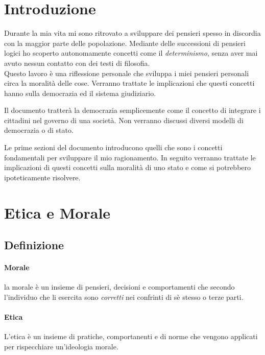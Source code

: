 \documentclass{article}
\begin{document}
\pagebreak

\tableofcontents
\pagebreak

\section{Introduzione}

Durante la mia vita mi sono ritrovato a sviluppare dei pensieri
spesso in discordia con la maggior parte delle popolazione.
Mediante delle successioni di pensieri logici ho scoperto autonomamente concetti
come il \textit{determinismo}, senza aver mai avuto nessun contatto con dei testi di filosofia.
\\
Questo lavoro è una riflessione personale che sviluppa i miei pensieri
personali circa la moralità delle cose. Verranno trattate le implicazioni
che questi concetti hanno sulla democrazia ed il sistema giudiziario.

Il documento tratterà la democrazia semplicemente come il concetto di integrare i cittadini
nel governo di una società. Non verranno discussi diversi modelli di democrazia o di stato.

Le prime sezioni del documento introducono quelli che sono i concetti fondamentali per
sviluppare il mio ragionamento. In seguito verranno trattate
le implicazioni di questi concetti sulla moralità di uno stato e come si potrebbero
ipoteticamente risolvere.

\section{Etica e Morale}

\subsection{Definizione}

\paragraph{Morale}
la morale è un insieme di pensieri, decisioni e comportamenti che secondo l'individuo
che li esercita sono \textit{corretti} nei confrinti di sè stesso o terze parti.

\paragraph{Etica}
L'etica è un insieme di pratiche, comportanenti e di norme che vengono applicati
per rispecchiare un'ideologia morale.
\end{document}
